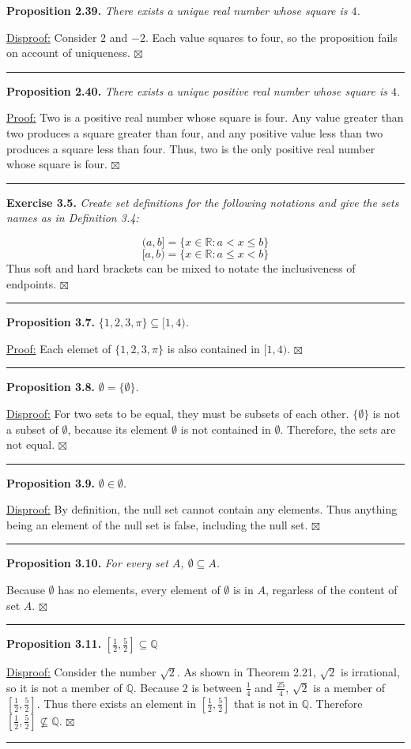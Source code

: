 \documentclass[a4paper,12pt]{article}
\newcommand{\entry}[3]
{
   \noindent\textbf{#1.}
   \emph{#2}
   \bigskip

   \noindent#3
   \bigskip
   \hrule
   \vspace{24pt}
}
\newcommand{\reals}{\mathbb{R}}
\newcommand{\sig}{$\boxtimes$}
\begin{document}
\entry{Proposition 2.39}
{There exists a unique real number whose square is $4$.}
{\underline{Disproof:} Consider $2$ and $-2$. Each value squares to four, so the proposition fails on account of uniqueness. \sig}



\entry{Proposition 2.40}
{There exists a unique positive real number whose square is $4$.}
{
\underline{Proof:} Two is a positive real number whose square is four. Any value greater than two produces a square greater than four, and any positive value less than two produces a square less than four. Thus, two is the only positive real number whose square is four. \sig
}



\entry{Exercise 3.5}
{Create set definitions for the following notations and give the sets names as in Definition 3.4:}
{
\[
(a, b] = \{ x \in \reals : a < x \leq b \}
\]
\[
[a, b) = \{ x \in \reals : a \leq x < b \}
\]
Thus soft and hard brackets can be mixed to notate the inclusiveness of endpoints. \sig
}



\entry{Proposition 3.7}
{$\{ 1, 2, 3, \pi \} \subseteq [1, 4)$.}
{\underline{Proof:} Each elemet of $\{ 1, 2, 3, \pi \}$ is also contained in $[1, 4)$. \sig}



\entry{Proposition 3.8}
{$\emptyset = \{ \emptyset \}$.}
{
\underline{Disproof:} For two sets to be equal, they must be subsets of each other. $\{ \emptyset \}$ is not a subset of $\emptyset$, because its element $\emptyset$ is not contained in $\emptyset$. Therefore, the sets are not equal. \sig
}



\entry{Proposition 3.9}
{$\emptyset \in \emptyset$.}
{\underline{Disproof:} By definition, the null set cannot contain any elements. Thus anything being an element of the null set is false, including the null set. \sig}



\entry{Proposition 3.10}
{For every set $A$, $\emptyset \subseteq A$.}
{Because $\emptyset$ has no elements, every element of $\emptyset$ is in $A$, regarless of the content of set $A$. \sig}



\entry{Proposition 3.11}
{$[\frac{1}{2}, \frac{5}{2}] \subseteq \mathbb{Q}$}
{\underline{Disproof:} Consider the number $\sqrt{2}$. As shown in Theorem 2.21, $\sqrt{2}$ is irrational, so it is not a member of $\mathbb{Q}$. Because $2$ is between $\frac{1}{4}$ and $\frac{25}{4}$, $\sqrt{2}$ is a member of $[\frac{1}{2}, \frac{5}{2}]$. Thus there exists an element in $[\frac{1}{2}, \frac{5}{2}]$ that is not in $\mathbb{Q}$. Therefore $[\frac{1}{2}, \frac{5}{2}] \not\subseteq \mathbb{Q}$. \sig}
\end{document}
